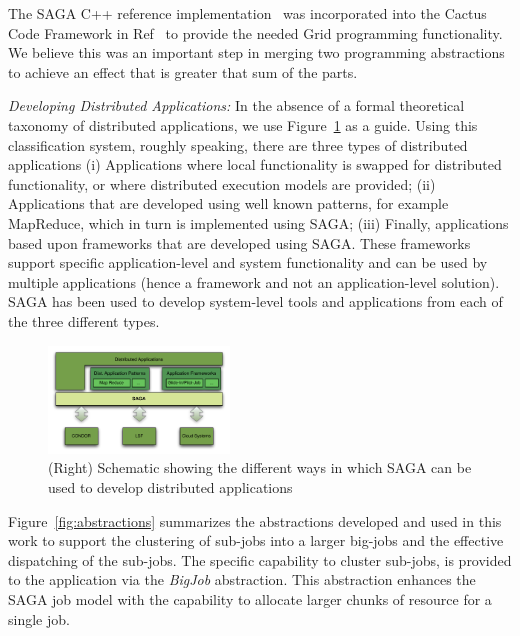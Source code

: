 \documentclass{sig-alternate}
\newcommand{\up}{\vspace*{-0.3em}}
\begin{document}
The SAGA C++ reference implementation~\cite{saga_web} was incorporated
into the Cactus Code Framework in Ref~\cite{escience07} to provide the
needed Grid programming functionality.  We believe this was an
important step in merging two programming abstractions to achieve an
effect that is greater that sum of the parts. 

{\it Developing Distributed Applications: } In the absence of a formal
theoretical taxonomy of distributed applications, we use 
Figure~\ref{sagaapps} as a guide.  Using this classification system,
roughly speaking, there are three types of distributed applications
(i) Applications where local functionality is swapped for distributed
functionality, or where distributed execution models are provided;
(ii) Applications that are developed using well known patterns, for
example MapReduce, which in turn is implemented using SAGA; (iii)
Finally, applications based upon frameworks that are developed using
SAGA. These frameworks support specific application-level and system
functionality and can be used by multiple applications (hence a
framework and not an application-level solution).  SAGA has been used
to develop system-level tools and applications from each of the three
different types.
\begin{figure}[!ht]
  \begin{center}
\includegraphics[width=0.43\textwidth]{saga_platform_figures.pdf}
\end{center}
  \caption{\small(Right) Schematic showing the different ways in which
    SAGA can be used to develop distributed applications}
 \label{sagaapps}
\end{figure} %
Figure~\ref{fig:abstractions} summarizes the abstractions developed
and used in this work to support the clustering of sub-jobs into a
larger big-jobs and the effective dispatching of the sub-jobs.  The
specific capability to cluster sub-jobs, is provided to the
application via the \emph{BigJob} abstraction. This abstraction
enhances the SAGA job model with the capability to allocate larger
chunks of resource for a single job.  
\end{document}
